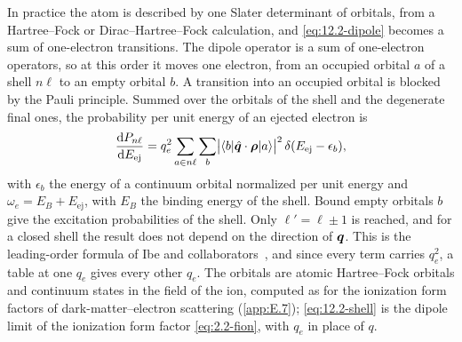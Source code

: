 In practice the atom is described by one Slater determinant of orbitals, from a Hartree--Fock or Dirac--Hartree--Fock calculation, and \cref{eq:12.2-dipole} becomes a sum of one-electron transitions. The dipole operator is a sum of one-electron operators, so at this order it moves one electron, from an occupied orbital $a$ of a shell $n\ell$ to an empty orbital $b$. A transition into an occupied orbital is blocked by the Pauli principle. Summed over the orbitals of the shell and the degenerate final ones, the probability per unit energy of an ejected electron is
\begin{equation}
  \frac{\mathrm{d} P_{n\ell}}{\mathrm{d} E_{\mathrm{ej}}} = q_e^2\sum_{a\in n\ell}\sum_b\bigl|\langle b|\hat{\bm{q}}\cdot\bm{\rho}|a\rangle\bigr|^2\,\delta(E_{\mathrm{ej}} - \epsilon_b) ,
  \label{eq:12.2-shell}
\end{equation}
with $\epsilon_b$ the energy of a continuum orbital normalized per unit energy and $\omega_e = E_B + E_{\mathrm{ej}}$, with $E_B$ the binding energy of the shell. Bound empty orbitals $b$ give the excitation probabilities of the shell. Only $\ell' = \ell \pm 1$ is reached, and for a closed shell the result does not depend on the direction of $\bm{q}$. This is the leading-order formula of Ibe and collaborators~\cite[Eqs.~(86)--(90)]{ibe2018migdal}, and since every term carries $q_e^2$, a table at one $q_e$ gives every other $q_e$. The orbitals are atomic Hartree--Fock orbitals and continuum states in the field of the ion, computed as for the ionization form factors of dark-matter--electron scattering (\cref{app:E.7}); \cref{eq:12.2-shell} is the dipole limit of the ionization form factor \cref{eq:2.2-fion}, with $q_e$ in place of $q$.

